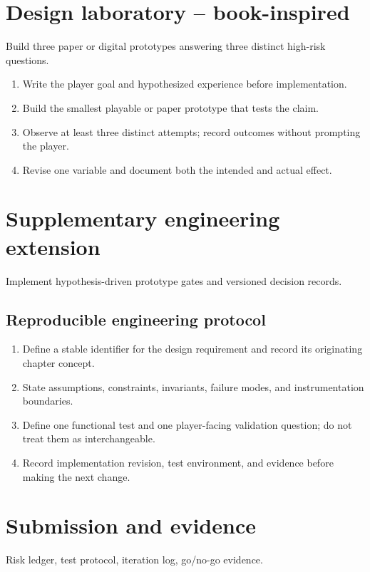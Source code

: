 \documentclass[11pt]{article}
\begin{document}
\section{Design laboratory -- book-inspired}
Build three paper or digital prototypes answering three distinct high-risk questions.

\begin{enumerate}
\item Write the player goal and hypothesized experience before implementation.
\item Build the smallest playable or paper prototype that tests the claim.
\item Observe at least three distinct attempts; record outcomes without prompting the player.
\item Revise one variable and document both the intended and actual effect.
\end{enumerate}

\section{Supplementary engineering extension}
Implement hypothesis-driven prototype gates and versioned decision records.


\subsection{Reproducible engineering protocol}
\begin{enumerate}
\item Define a stable identifier for the design requirement and record its originating chapter concept.
\item State assumptions, constraints, invariants, failure modes, and instrumentation boundaries.
\item Define one functional test and one player-facing validation question; do not treat them as interchangeable.
\item Record implementation revision, test environment, and evidence before making the next change.
\end{enumerate}

\section{Submission and evidence}
Risk ledger, test protocol, iteration log, go/no-go evidence.
\end{document}

